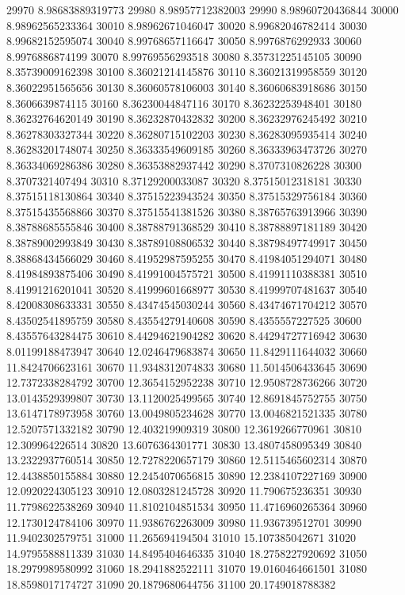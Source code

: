 {29970 8.98683889319773
29980 8.98957712382003
29990 8.98960720436844
30000 8.98962565233364
30010 8.98962671046047
30020 8.99682046782414
30030 8.99682152595074
30040 8.99768657116647
30050 8.9976876292933
30060 8.9976886874199
30070 8.99769556293518
30080 8.35731225145105
30090 8.35739009162398
30100 8.36021214145876
30110 8.36021319958559
30120 8.36022951565656
30130 8.36060578106003
30140 8.36060683918686
30150 8.3606639874115
30160 8.36230044847116
30170 8.36232253948401
30180 8.36232764620149
30190 8.36232870432832
30200 8.36232976245492
30210 8.36278303327344
30220 8.36280715102203
30230 8.36283095935414
30240 8.36283201748074
30250 8.36333549609185
30260 8.36333963473726
30270 8.36334069286386
30280 8.36353882937442
30290 8.3707310826228
30300 8.3707321407494
30310 8.37129200033087
30320 8.37515012318181
30330 8.37515118130864
30340 8.37515223943524
30350 8.37515329756184
30360 8.37515435568866
30370 8.37515541381526
30380 8.38765763913966
30390 8.38788685555846
30400 8.38788791368529
30410 8.38788897181189
30420 8.38789002993849
30430 8.38789108806532
30440 8.38798497749917
30450 8.38868434566029
30460 8.41952987595255
30470 8.41984051294071
30480 8.41984893875406
30490 8.41991004575721
30500 8.41991110388381
30510 8.41991216201041
30520 8.41999601668977
30530 8.41999707481637
30540 8.42008308633331
30550 8.43474545030244
30560 8.43474671704212
30570 8.43502541895759
30580 8.43554279140608
30590 8.4355557227525
30600 8.43557643284475
30610 8.44294621904282
30620 8.44294727716942
30630 8.01199188473947
30640 12.0246479683874
30650 11.8429111644032
30660 11.8424706623161
30670 11.9348312074833
30680 11.5014506433645
30690 12.7372338284792
30700 12.3654152952238
30710 12.9508728736266
30720 13.0143529399807
30730 13.1120025499565
30740 12.8691845752755
30750 13.6147178973958
30760 13.0049805234628
30770 13.0046821521335
30780 12.5207571332182
30790 12.403219909319
30800 12.3619266770961
30810 12.309964226514
30820 13.6076364301771
30830 13.4807458095349
30840 13.2322937760514
30850 12.7278220657179
30860 12.5115465602314
30870 12.4438850155884
30880 12.2454070656815
30890 12.2384107227169
30900 12.0920224305123
30910 12.0803281245728
30920 11.790675236351
30930 11.7798622538269
30940 11.8102104851534
30950 11.4716960265364
30960 12.1730124784106
30970 11.9386762263009
30980 11.936739512701
30990 11.9402302579751
31000 11.265694194504
31010 15.107385042671
31020 14.9795588811339
31030 14.8495404646335
31040 18.2758227920692
31050 18.2979989580992
31060 18.2941882522111
31070 19.0160464661501
31080 18.8598017174727
31090 20.1879680644756
31100 20.1749018788382
}
